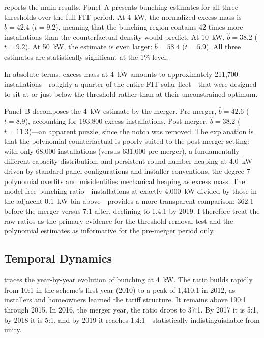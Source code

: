\documentclass[12pt]{article}
\begin{document}


 reports the main results. Panel~A presents bunching estimates for all three thresholds over the full FIT period. At 4~kW, the normalized excess mass is $\hat{b} = 42.4$ ($t = 9.2$), meaning that the bunching region contains 42 times more installations than the counterfactual density would predict. At 10~kW, $\hat{b} = 38.2$ ($t = 9.2$). At 50~kW, the estimate is even larger: $\hat{b} = 58.4$ ($t = 5.9$). All three estimates are statistically significant at the 1\% level.

In absolute terms, excess mass at 4~kW amounts to approximately 211,700 installations---roughly a quarter of the entire FIT solar fleet---that were designed to sit at or just below the threshold rather than at their unconstrained optimum.

Panel~B decomposes the 4~kW estimate by the merger. Pre-merger, $\hat{b} = 42.6$ ($t = 8.9$), accounting for 193,800 excess installations. Post-merger, $\hat{b} = 38.2$ ($t = 11.3$)---an apparent puzzle, since the notch was removed. The explanation is that the polynomial counterfactual is poorly suited to the post-merger setting: with only 68,000 installations (versus 631,000 pre-merger), a fundamentally different capacity distribution, and persistent round-number heaping at 4.0~kW driven by standard panel configurations and installer conventions, the degree-7 polynomial overfits and misidentifies mechanical heaping as excess mass. The model-free bunching ratio---installations at exactly 4.000~kW divided by those in the adjacent 0.1~kW bin above---provides a more transparent comparison: 362:1 before the merger versus 7:1 after, declining to 1.4:1 by 2019. I therefore treat the raw ratios as the primary evidence for the threshold-removal test and the polynomial estimates as informative for the pre-merger period only.

\subsection{Temporal Dynamics}



 traces the year-by-year evolution of bunching at 4~kW. The ratio builds rapidly from 10:1 in the scheme's first year (2010) to a peak of 1,410:1 in 2012, as installers and homeowners learned the tariff structure. It remains above 190:1 through 2015. In 2016, the merger year, the ratio drops to 37:1. By 2017 it is 5:1, by 2018 it is 5:1, and by 2019 it reaches 1.4:1---statistically indistinguishable from unity.
\end{document}
